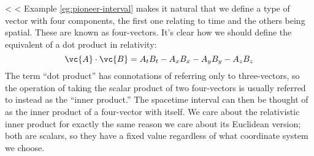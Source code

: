 <%
<%
Example \ref{eg:pioneer-interval} makes it natural that we define a type of vector with four components,
the first one relating to time and the others being spatial. These are known as four-vectors.
It's clear how we should define the equivalent of a dot product in
relativity:
\begin{equation*}
  \vc{A}\cdot\vc{B} = A_t B_t - A_xB_x - A_yB_y - A_zB_z
\end{equation*}
The term ``dot product'' has connotations of referring only to 
three-vectors, so the operation of taking the scalar product of two four-vectors is usually referred to
instead as the ``inner product.''
The spacetime interval can then be thought of as the inner product of a four-vector with itself.
We care about the relativistic inner product for exactly the same reason we care about its Euclidean
version; both are scalars, so they have a fixed value regardless of what coordinate system we choose.

\vspace{10mm}

